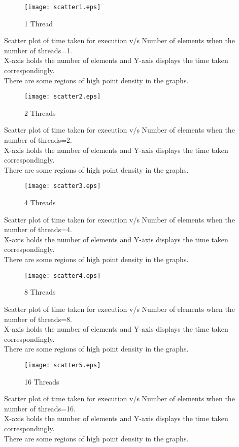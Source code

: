 \documentclass{article}
\begin{document}
\maketitle

\clearpage
\begin{figure}
\texttt{[image: scatter1.eps]}
\caption{1 Thread}
\label{fig:Scatter1 graph}
\end{figure}
\noindent
Scatter plot of time taken for execution v/s Number of
elements when the number of threads=1. \\
X-axis holds the number of elements and
Y-axis displays the time taken correspondingly.\\
There are some regions of high point density in the graphs.
\clearpage

\begin{figure}
\texttt{[image: scatter2.eps]}
\caption{2 Threads}
\label{fig:Scatter2 graph}
\end{figure}
\noindent
Scatter plot of time taken for execution v/s Number of
elements when the number of threads=2. \\
X-axis holds the number of elements and
Y-axis displays the time taken correspondingly.\\
There are some regions of high point density in the graphs.
\clearpage

\begin{figure}
\texttt{[image: scatter3.eps]}
\caption{4 Threads}
\label{fig:Scatter3 graph}
\end{figure}
\noindent
Scatter plot of time taken for execution v/s Number of
elements when the number of threads=4. \\
X-axis holds the number of elements and
Y-axis displays the time taken correspondingly.\\
There are some regions of high point density in the graphs.
\clearpage

\begin{figure}
\texttt{[image: scatter4.eps]}
\caption{8 Threads}
\label{fig:Scatter4 graph}
\end{figure}
\noindent
Scatter plot of time taken for execution v/s Number of
elements when the number of threads=8. \\
X-axis holds the number of elements and
Y-axis displays the time taken correspondingly.\\
There are some regions of high point density in the graphs.
\clearpage

\begin{figure}
\texttt{[image: scatter5.eps]}
\caption{16 Threads}
\label{fig:Scatter5 graph}
\end{figure}
\noindent
Scatter plot of time taken for execution v/s Number of
elements when the number of threads=16. \\
X-axis holds the number of elements and
Y-axis displays the time taken correspondingly.\\
There are some regions of high point density in the graphs.
\clearpage
\end{document}
